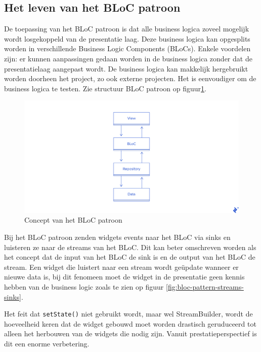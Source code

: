 \subsection*{Het leven van het BLoC patroon}
De toepassing van het BLoC patroon is dat alle business logica zoveel mogelijk wordt losgekoppeld van de presentatie laag. Deze business logica kan opgesplits worden in verschillende Business Logic Components (BLoCs). Enkele voordelen zijn: er kunnen aanpassingen gedaan worden in de business logica zonder dat de presentatielaag aangepast wordt. De business logica kan makkelijk hergebruikt worden doorheen het project, zo ook externe projecten. Het is eenvoudiger om de business logica te testen. Zie structuur BLoC patroon op figuur\ref{fig:bloc-pattern}.

\begin{figure}[H]
    \centering
    \includegraphics[width=\figureWidthModifier\linewidth]{img/stand-van-zaken/bloc-pattern.png}
    \caption{Concept van het BLoC patroon \autocite{Perutovic2018}}
    \label{fig:bloc-pattern}
\end{figure}

Bij het BLoC patroon zenden widgets events naar het BLoC via sinks en luisteren ze naar de streams van het BLoC.
Dit kan beter omschreven worden als het concept dat de input van het BLoC de sink is en de output van het BLoC de stream. Een widget die luistert naar een stream wordt geüpdate wanneer er nieuwe data is, bij dit fenomeen moet de widget in de presentatie geen kennis hebben van de business logic zoals te zien op figuur \ref{fig:bloc-pattern-streams-sinks}. 

Het feit dat \verb|setState()| niet gebruikt wordt, maar wel StreamBuilder, wordt de hoeveelheid keren dat de widget gebouwd moet worden drastisch geruduceerd tot alleen het herbouwen van de widgets die nodig zijn.
Vanuit prestatieperspectief is dit een enorme verbetering.


